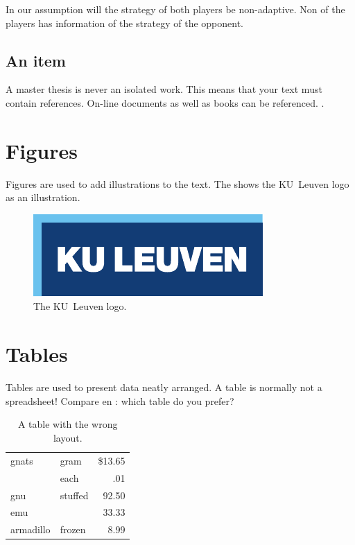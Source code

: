 In our assumption will the strategy of both players be non-adaptive. Non of the players has information of the strategy of the opponent. 


\subsection{An item}
A master thesis is never an isolated work. This means that your text must
contain references. On-line documents\cite{FlipThem} as well as
books\cite{DefendingAgainstUnknownEnemy} can be referenced. \cite{Craig2005}.

\section{Figures}
Figures are used to add illustrations to the text. The  shows
the KU~Leuven logo as an illustration.
\begin{figure}
  \centering
  \includegraphics{logokul}
  \caption{The KU~Leuven logo.}
  \label{fig:logo}
\end{figure}

\section{Tables}
Tables are used to present data neatly arranged. A table is normally
not a spreadsheet! Compare  en : which table do
you prefer?

\begin{table}
  \centering
  \begin{tabular}{||l|lr||} \hline
    gnats     & gram      & \$13.65 \\ \cline{2-3}
              & each      & .01 \\ \hline
    gnu       & stuffed   & 92.50 \\ \cline{1-1} \cline{3-3}
    emu       &           & 33.33 \\ \hline
    armadillo & frozen    & 8.99 \\ \hline
  \end{tabular}
  \caption{A table with the wrong layout.}
  \label{tab:wrong}
\end{table}

